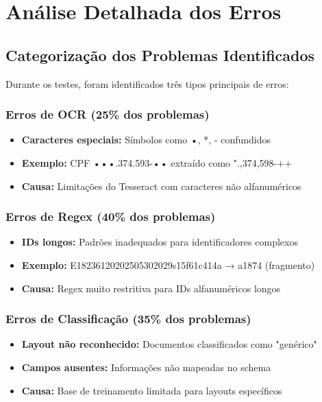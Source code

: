 \section{Análise Detalhada dos Erros}

\subsection{Categorização dos Problemas Identificados}

Durante os testes, foram identificados três tipos principais de erros:

\subsubsection{Erros de OCR (25\% dos problemas)}
\begin{itemize}
    \item \textbf{Caracteres especiais:} Símbolos como •, *, - confundidos
    \item \textbf{Exemplo:} CPF •••.374.593-•• extraído como ".,374,598-++
    \item \textbf{Causa:} Limitações do Tesseract com caracteres não alfanuméricos
\end{itemize}

\subsubsection{Erros de Regex (40\% dos problemas)}
\begin{itemize}
    \item \textbf{IDs longos:} Padrões inadequados para identificadores complexos
    \item \textbf{Exemplo:} E18236120202505302029s15f61c414a → a1874 (fragmento)
    \item \textbf{Causa:} Regex muito restritiva para IDs alfanuméricos longos
\end{itemize}

\subsubsection{Erros de Classificação (35\% dos problemas)}
\begin{itemize}
    \item \textbf{Layout não reconhecido:} Documentos classificados como "genérico"
    \item \textbf{Campos ausentes:} Informações não mapeadas no schema
    \item \textbf{Causa:} Base de treinamento limitada para layouts específicos
\end{itemize}

